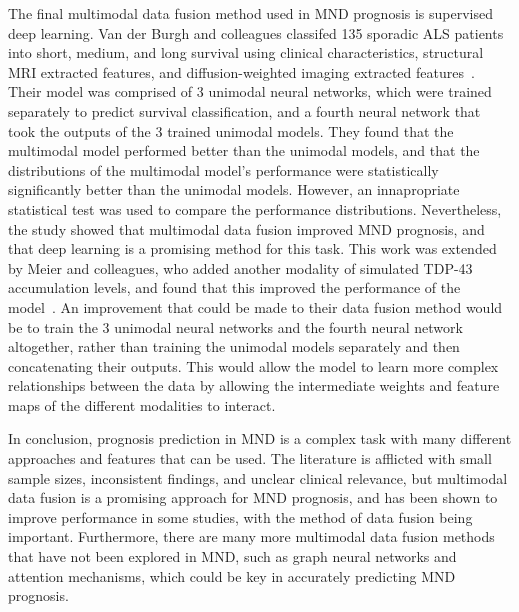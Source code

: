 The final multimodal data fusion method used in MND prognosis is supervised deep learning.
Van der Burgh and colleagues classifed 135 sporadic ALS patients into short, medium, and long survival using clinical characteristics, structural MRI extracted features, and diffusion-weighted imaging extracted features~\cite{vanderburghDeepLearningPredictions2017}.
Their model was comprised of 3 unimodal neural networks, which were trained separately to predict survival classification, and a fourth neural network that took the outputs of the 3 trained unimodal models.
They found that the multimodal model performed better than the unimodal models, and that the distributions of the multimodal model's performance were statistically significantly better than the unimodal models.
However, an innapropriate statistical test was used to compare the performance distributions.
Nevertheless, the study showed that multimodal data fusion improved MND prognosis, and that deep learning is a promising method for this task.
This work was extended by Meier and colleagues, who added another modality of simulated TDP-43 accumulation levels, and found that this improved the performance of the model~\cite{meierConnectomeBasedPropagation2020}.
An improvement that could be made to their data fusion method would be to train the 3 unimodal neural networks and the fourth neural network altogether, rather than training the unimodal models separately and then concatenating their outputs.
This would allow the model to learn more complex relationships between the data by allowing the intermediate weights and feature maps of the different modalities to interact.

In conclusion, prognosis prediction in MND is a complex task with many different approaches and features that can be used.
The literature is afflicted with small sample sizes, inconsistent findings, and unclear clinical relevance, but multimodal data fusion is a promising approach for MND prognosis, and has been shown to improve performance in some studies, with the method of data fusion being important.
Furthermore, there are many more multimodal data fusion methods that have not been explored in MND, such as graph neural networks and attention mechanisms, which could be key in accurately predicting MND prognosis.
